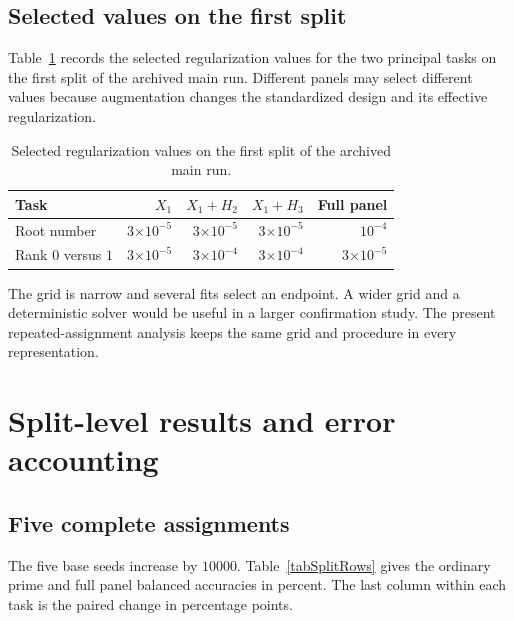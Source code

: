 \documentclass[12pt,reqno]{amsart}
\numberwithin{equation}{section}
\theoremstyle{plain}
\theoremstyle{definition}
\theoremstyle{remark}
\begin{document}
\subsection{Selected values on the first split}

Table~\ref{tabSelectedAlpha} records the selected regularization values for the two principal tasks on the first split of the archived main run.
Different panels may select different values because augmentation changes the standardized design and its effective regularization.

\begin{table}[H]
\centering
\caption{Selected regularization values on the first split of the archived main run.}
\label{tabSelectedAlpha}
\begin{tabular}{lrrrr}
\toprule
Task & $X_1$ & $X_1+H_2$ & $X_1+H_3$ & Full panel\\
\midrule
Root number & $3\mathord{\times}10^{-5}$ &
$3\mathord{\times}10^{-5}$ &
$3\mathord{\times}10^{-5}$ & $10^{-4}$\\
Rank $0$ versus $1$ & $3\mathord{\times}10^{-5}$ &
$3\mathord{\times}10^{-4}$ &
$3\mathord{\times}10^{-4}$ & $3\mathord{\times}10^{-5}$\\
\bottomrule
\end{tabular}
\end{table}

The grid is narrow and several fits select an endpoint.
A wider grid and a deterministic solver would be useful in a larger confirmation study.
The present repeated-assignment analysis keeps the same grid and procedure in every representation.

\section{Split-level results and error accounting}
\label{appResults}

\subsection{Five complete assignments}

The five base seeds increase by $10000$.
Table~\ref{tabSplitRows} gives the ordinary prime and full panel balanced accuracies in percent.
The last column within each task is the paired change in percentage points.
\end{document}
